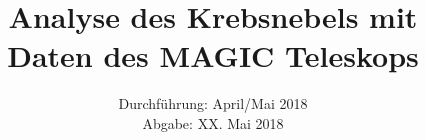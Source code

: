 

\subject{Lehrstuhlversuch E5b}
\title{Analyse des Krebsnebels mit Daten des MAGIC Teleskops}
\date{Durchführung: April/Mai 2018 \\
      Abgabe: XX. Mai 2018}



\maketitle
\newpage






\printbibliography


